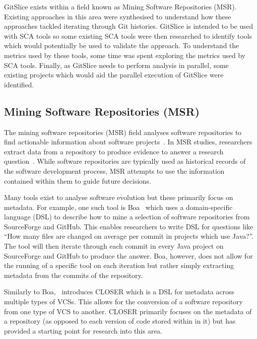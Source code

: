 GitSlice exists within a field known as Mining Software Repositories (MSR).
Existing approaches in this area were synthesised to understand how these approaches tackled iterating through Git histories.
GitSlice is intended to be used with SCA tools so some existing SCA tools were then researched to identify tools which would potentially be used to validate the approach.
To understand the metrics used by these tools, some time was spent exploring the metrics used by SCA tools.
Finally, as GitSlice needs to perform analysis in parallel, some existing projects which would aid the parallel execution of GitSlice were identified.

\subsection{Mining Software Repositories (MSR)}
\label{subsec:mining-software-repositories-(msr)}

The mining software repositories (MSR) field analyses software repositories to find actionable information about software projects~\cite{msrconf}.
In MSR studies, researchers extract data from a repository to produce evidence to answer a research question~\cite{road_ahead_for_msr}.
While software repositories are typically used as historical records of the software development process, MSR attempts to use the information contained within them to guide future decisions.

Many tools exist to analyse software evolution but these primarily focus on metadata.
For example, one such tool is Boa~\cite{boa} which uses a domain-specific language (DSL) to describe how to mine a selection of software repositories from SourceForge and GitHub.
This enables researchers to write DSL for questions like ``How many files are changed on average per commit in projects which use Java?''.
The tool will then iterate through each commit in every Java project on SourceForge and GitHub to produce the answer.
Boa, however, does not allow for the running of a specific tool on each iteration but rather simply extracting metadata from the commits of the repository.

Similarly to Boa,~\cite{closer} introduces CLOSER which is a DSL for metadata across multiple types of VCSs.
This allows for the conversion of a software repository from one type of VCS to another.
CLOSER primarily focuses on the metadata of a repository (as opposed to each version of code stored within in it) but has provided a starting point for research into this area.

